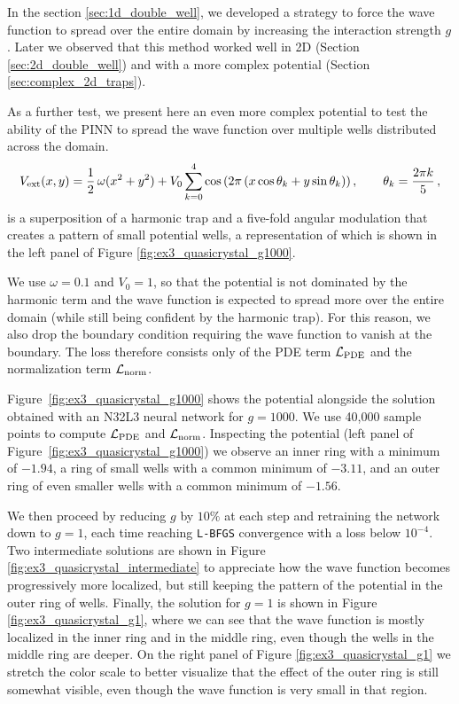 \documentclass[a4paper, titlepage]{article}
\begin{document}
In the section \ref{sec:1d_double_well}, we developed a strategy to force the
wave function to spread over the entire domain by increasing the interaction
strength $g$. 
Later we observed that this method worked well in 2D (Section 
\ref{sec:2d_double_well}) and with a more complex potential (Section 
\ref{sec:complex_2d_traps}).

As a further test, we present here an even more complex potential to test the
ability of the PINN to spread the wave function over multiple wells distributed 
across the domain.
\begin{equation}
    V_{\rm ext}(x,y) = \frac{1}{2}\,\omega (x^2 + y^2)
    + V_0 \sum_{k=0}^4 \cos\left(2\pi\left(x\cos\theta_k + y\sin\theta_k\right)\right),
    \qquad
    \theta_k = \frac{2\pi k}{5}\,,
    \label{eq:spread_out_potential}
\end{equation}
is a superposition of a harmonic trap and a five-fold angular modulation
that creates a pattern of small potential wells, a representation of which is
shown in the left panel of Figure \ref{fig:ex3_quasicrystal_g1000}.

We use $\omega = 0.1$ and $V_0 = 1$, so that the potential is not dominated by
the harmonic term and the wave function is expected to spread more over the
entire domain (while still being confident by the harmonic trap).
For this reason, we also drop the boundary condition requiring the wave
function to vanish at the boundary. The loss therefore consists only of the PDE
term $\mathcal{L}_{\rm PDE}$ and the normalization term
$\mathcal{L}_{\rm norm}$.

Figure~\ref{fig:ex3_quasicrystal_g1000} shows the potential alongside the
solution obtained with an N32L3 neural network for $g = 1000$. We use 40,000
sample points to compute $\mathcal{L}_{\rm PDE}$ and
$\mathcal{L}_{\rm norm}$. Inspecting the potential (left panel of
Figure~\ref{fig:ex3_quasicrystal_g1000}) we observe an inner ring with a
minimum of $-1.94$, a ring of small wells with a common minimum of $-3.11$,
and an outer ring of even smaller wells with a common minimum of $-1.56$.

We then proceed by reducing $g$ by $10\%$ at each step and retraining the
network down to $g = 1$, each time reaching \texttt{L-BFGS} convergence with a
loss below $10^{-4}$.
Two intermediate solutions are shown in Figure
\ref{fig:ex3_quasicrystal_intermediate} to appreciate how the wave function 
becomes progressively more localized, but still keeping the pattern of the
potential in the outer ring of wells.
Finally, the solution for $g = 1$ is shown in Figure
\ref{fig:ex3_quasicrystal_g1}, where we can see that the wave function is
mostly localized in the inner ring and in the middle ring, even though the wells 
in the middle ring are deeper. On the right panel of Figure 
\ref{fig:ex3_quasicrystal_g1} we stretch the color scale to better visualize 
that the effect of the outer ring is still somewhat visible, even though the 
wave function is very small in that region.
\end{document}
